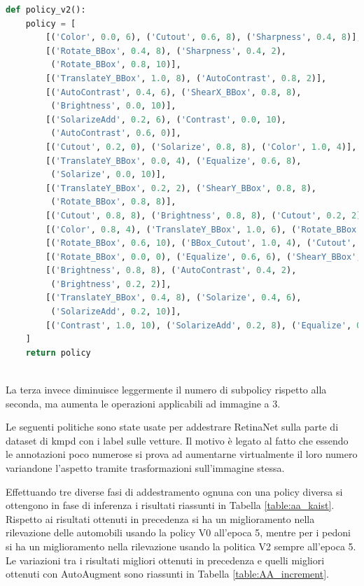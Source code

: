 \begin{lstlisting}[caption={Policy V2 di AutoAugment}, language=Python, basicstyle=\tiny,label=code:policy_v2]
def policy_v2():
    policy = [
        [('Color', 0.0, 6), ('Cutout', 0.6, 8), ('Sharpness', 0.4, 8)],
        [('Rotate_BBox', 0.4, 8), ('Sharpness', 0.4, 2),
         ('Rotate_BBox', 0.8, 10)],
        [('TranslateY_BBox', 1.0, 8), ('AutoContrast', 0.8, 2)],
        [('AutoContrast', 0.4, 6), ('ShearX_BBox', 0.8, 8),
         ('Brightness', 0.0, 10)],
        [('SolarizeAdd', 0.2, 6), ('Contrast', 0.0, 10),
         ('AutoContrast', 0.6, 0)],
        [('Cutout', 0.2, 0), ('Solarize', 0.8, 8), ('Color', 1.0, 4)],
        [('TranslateY_BBox', 0.0, 4), ('Equalize', 0.6, 8),
         ('Solarize', 0.0, 10)],
        [('TranslateY_BBox', 0.2, 2), ('ShearY_BBox', 0.8, 8),
         ('Rotate_BBox', 0.8, 8)],
        [('Cutout', 0.8, 8), ('Brightness', 0.8, 8), ('Cutout', 0.2, 2)],
        [('Color', 0.8, 4), ('TranslateY_BBox', 1.0, 6), ('Rotate_BBox', 0.6, 6)],
        [('Rotate_BBox', 0.6, 10), ('BBox_Cutout', 1.0, 4), ('Cutout', 0.2, 8)],
        [('Rotate_BBox', 0.0, 0), ('Equalize', 0.6, 6), ('ShearY_BBox', 0.6, 8)],
        [('Brightness', 0.8, 8), ('AutoContrast', 0.4, 2),
         ('Brightness', 0.2, 2)],
        [('TranslateY_BBox', 0.4, 8), ('Solarize', 0.4, 6),
         ('SolarizeAdd', 0.2, 10)],
        [('Contrast', 1.0, 10), ('SolarizeAdd', 0.2, 8), ('Equalize', 0.2, 4)],
    ]
    return policy
  
\end{lstlisting}
La terza invece diminuisce leggermente il numero di subpolicy rispetto alla seconda, ma aumenta le operazioni applicabili ad immagine a 3. 

Le seguenti politiche sono state usate per addestrare RetinaNet sulla parte di dataset di \ac{kmpd} con i label sulle vetture. Il motivo è legato al fatto che essendo le annotazioni poco numerose si prova ad aumentarne virtualmente il loro numero variandone l'aspetto tramite trasformazioni sull'immagine stessa.

Effettuando tre diverse fasi di addestramento ognuna con una policy diversa si ottengono in fase di inferenza i risultati riassunti in Tabella \ref{table:aa_kaist}. Rispetto ai risultati ottenuti in precedenza si ha un miglioramento nella rilevazione delle automobili usando la policy V0 all'epoca 5, mentre per i pedoni si ha un miglioramento nella rilevazione usando la politica V2 sempre all'epoca 5. Le variazioni tra i risultati migliori ottenuti in precedenza e quelli migliori ottenuti con AutoAugment sono riassunti in Tabella \ref{table:AA_increment}.

